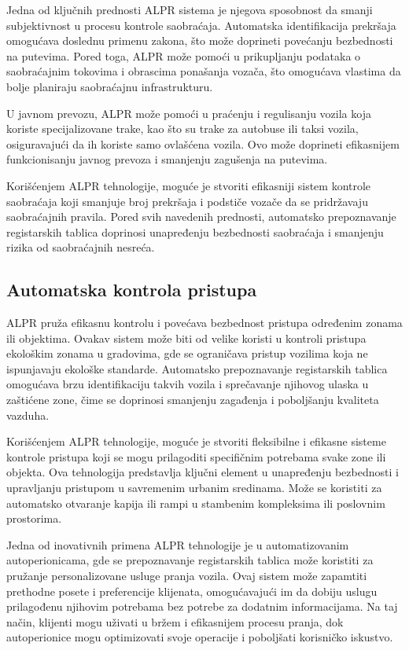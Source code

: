 \documentclass[a4paper,12pt]{article}
\begin{document}
	Jedna od ključnih prednosti ALPR sistema je njegova sposobnost da smanji subjektivnost u procesu kontrole saobraćaja. Automatska identifikacija prekršaja omogućava doslednu primenu zakona, što može doprineti povećanju bezbednosti na putevima. Pored toga, ALPR može pomoći u prikupljanju podataka o saobraćajnim tokovima i obrascima ponašanja vozača, što omogućava vlastima da bolje planiraju saobraćajnu infrastrukturu.
	
	U javnom prevozu, ALPR može pomoći u praćenju i regulisanju vozila koja koriste specijalizovane trake, kao što su trake za autobuse ili taksi vozila, osiguravajući da ih koriste samo ovlašćena vozila. Ovo može doprineti efikasnijem funkcionisanju javnog prevoza i smanjenju zagušenja na putevima.
	
	Korišćenjem ALPR tehnologije, moguće je stvoriti efikasniji sistem kontrole saobraćaja koji smanjuje broj prekršaja i podstiče vozače da se pridržavaju saobraćajnih pravila. Pored svih navedenih prednosti, automatsko prepoznavanje registarskih tablica doprinosi unapređenju bezbednosti saobraćaja i smanjenju rizika od saobraćajnih nesreća.
	
	\subsection{Automatska kontrola pristupa}
	ALPR pruža efikasnu kontrolu i povećava bezbednost pristupa određenim zonama ili objektima. Ovakav sistem može biti od velike koristi u kontroli pristupa ekološkim zonama u gradovima, gde se ograničava pristup vozilima koja ne ispunjavaju ekološke standarde. Automatsko prepoznavanje registarskih tablica omogućava brzu identifikaciju takvih vozila i sprečavanje njihovog ulaska u zaštićene zone, čime se doprinosi smanjenju zagađenja i poboljšanju kvaliteta vazduha.
	
	Korišćenjem ALPR tehnologije, moguće je stvoriti fleksibilne i efikasne sisteme kontrole pristupa koji se mogu prilagoditi specifičnim potrebama svake zone ili objekta. Ova tehnologija predstavlja ključni element u unapređenju bezbednosti i upravljanju pristupom u savremenim urbanim sredinama.
	Može se koristiti za automatsko otvaranje kapija ili rampi u stambenim kompleksima ili poslovnim prostorima.
	
	Jedna od inovativnih primena ALPR tehnologije je u automatizovanim autoperionicama, gde se prepoznavanje registarskih tablica može koristiti za pružanje personalizovane usluge pranja vozila. Ovaj sistem može zapamtiti prethodne posete i preferencije klijenata, omogućavajući im da dobiju uslugu prilagođenu njihovim potrebama bez potrebe za dodatnim informacijama. Na taj način, klijenti mogu uživati u bržem i efikasnijem procesu pranja, dok autoperionice mogu optimizovati svoje operacije i poboljšati korisničko iskustvo.
	
\end{document}
